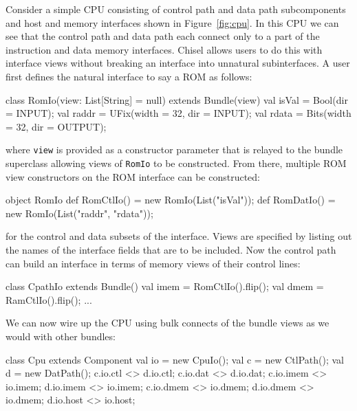 \documentclass[10pt]{article}
\begin{document}
Consider a simple CPU consisting of control path and data path subcomponents and host and memory interfaces shown in Figure~\ref{fig:cpu}.
In this CPU we can see that the control path and data path each connect only to a part of the instruction and data memory interfaces. 
Chisel allows users to do this with interface views without breaking an interface into unnatural subinterfaces.
A user first defines the natural interface to say a ROM as follows:

\begin{scala}
class RomIo(view: List[String] = null) extends Bundle(view) {
  val isVal = Bool(dir = INPUT);
  val raddr = UFix(width = 32, dir = INPUT);
  val rdata = Bits(width = 32, dir = OUTPUT);
}
\end{scala}

\noindent
where \verb+view+ is provided as a constructor parameter that is relayed to the bundle superclass allowing views of \verb+RomIo+ to be constructed.
From there, multiple ROM view constructors on the ROM interface can be constructed:

\begin{scala}
object RomIo {
  def RomCtlIo() = new RomIo(List("isVal"));
  def RomDatIo() = new RomIo(List("raddr", "rdata"));
}
\end{scala}

\noindent
for the control and data subsets of the interface.  
Views are specified by listing out the names of the interface fields that are to be included.  
Now the control path can build an interface in terms of memory views of their control lines:

\begin{scala}
class CpathIo extends Bundle() {
  val imem = RomCtlIo().flip();
  val dmem = RamCtlIo().flip();
  ...
}
\end{scala}

\noindent
We can now wire up the CPU using bulk connects of the bundle views as we would with other bundles:

\begin{scala}
class Cpu extends Component {
  val io = new CpuIo();
  val c  = new CtlPath();
  val d  = new DatPath();
  c.io.ctl  <> d.io.ctl;
  c.io.dat  <> d.io.dat;
  c.io.imem <> io.imem;
  d.io.imem <> io.imem;
  c.io.dmem <> io.dmem;
  d.io.dmem <> io.dmem;
  d.io.host <> io.host;
}
\end{scala}
\end{document}
